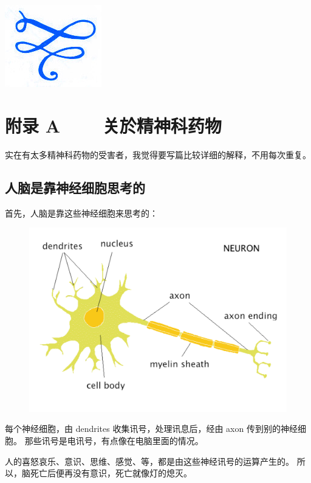 \documentclass[12pt]{report}
\begin{document}
{\begin{center}
\includegraphics[scale=0.25]{vignette0.jpg}
\end{center}

\appendix
\renewcommand{\thechapter}{A}
\chapter*{附录 A ~~~ 关於精神科药物}

实在有太多精神科药物的受害者，我觉得要写篇比较详细的解释，不用每次重复。

\section{人脑是靠神经细胞思考的}

首先，人脑是靠这些神经细胞来思考的：
\begin{figure}[H]
\centering
\includegraphics[scale=0.4]{neuron.pdf}
\end{figure}

每个神经细胞，由 dendrites 收集讯号，处理讯息后，经由 axon 传到别的神经细胞。 那些讯号是电讯号，有点像在电脑里面的情况。

人的喜怒哀乐、意识、思维、感觉、等，都是由这些神经讯号的运算产生的。 所以，脑死亡后便再没有意识，死亡就像灯的熄灭。

}
\end{document}
